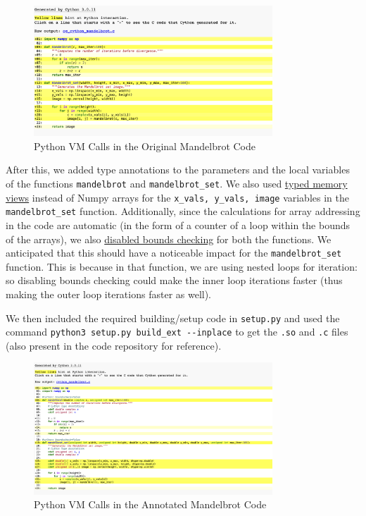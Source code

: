 \documentclass[a4paper,12pt]{article}
\begin{document}
\begin{figure}[H]
  \centering
  \includegraphics[width=0.8\textwidth]{images/og_mandelbrot_cython.png}
  \caption{Python VM Calls in the Original Mandelbrot Code}
\end{figure}

After this, we added type annotations to the parameters and the local variables of the functions \verb|mandelbrot| and \verb|mandelbrot_set|. We also used \underline{typed memory views} instead of Numpy arrays for the \verb|x_vals, y_vals, image| variables in the \verb|mandelbrot_set| function. Additionally, since the calculations for array addressing in the code are automatic (in the form of a counter of a loop within the bounds of the arrays), we also \underline{disabled bounds checking} for both the functions. We anticipated that this should have a noticeable impact for the \verb|mandelbrot_set| function. This is because in that function, we are using nested loops for iteration: so disabling bounds checking could make the inner loop iterations faster (thus making the outer loop iterations faster as well). 

We then included the required building/setup code in \verb|setup.py| and used the command \verb|python3 setup.py build_ext --inplace| to get the \verb|.so| and \verb|.c| files (also present in the code repository for reference). 

\begin{figure}[H]
  \centering
  \includegraphics[width=0.8\textwidth]{images/after_annotate_mandelbrot.png}
  \caption{Python VM Calls in the Annotated Mandelbrot Code}
\end{figure}
\end{document}
